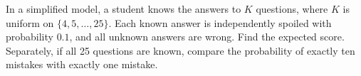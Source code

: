 In a simplified model, a student knows the answers to $K$ questions, where $K$ is uniform on $\{4,5,\ldots,25\}$. Each known answer is independently spoiled with probability $0.1$, and all unknown answers are wrong. Find the expected score. Separately, if all 25 questions are known, compare the probability of exactly ten mistakes with exactly one mistake.
